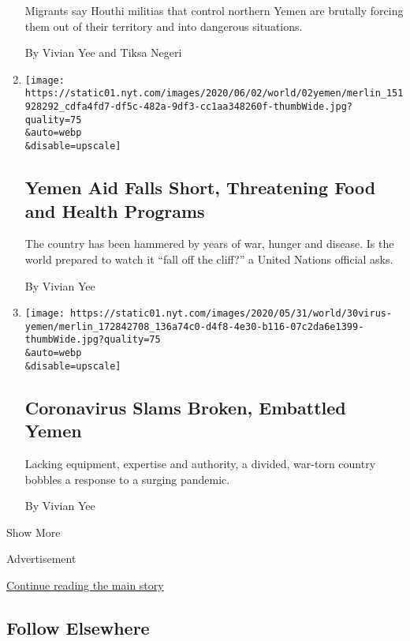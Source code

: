 \begin{enumerate}
  Migrants say Houthi militias that control northern Yemen are brutally
  forcing them out of their territory and into dangerous situations.

  By Vivian Yee and Tiksa Negeri
\item
  \href{/2020/06/02/world/middleeast/yemen-saudi-united-nations-aid.html}{}

  \texttt{[image: https://static01.nyt.com/images/2020/06/02/world/02yemen/merlin\_151928292\_cdfa4fd7-df5c-482a-9df3-cc1aa348260f-thumbWide.jpg?quality=75\\\&auto=webp\\\&disable=upscale]}

  \hypertarget{yemen-aid-falls-short-threatening-food-and-health-programs}{%
  \subsection{Yemen Aid Falls Short, Threatening Food and Health
  Programs}\label{yemen-aid-falls-short-threatening-food-and-health-programs}}

  The country has been hammered by years of war, hunger and disease. Is
  the world prepared to watch it ``fall off the cliff?'' a United
  Nations official asks.

  By Vivian Yee
\item
  \href{/2020/05/30/world/middleeast/virus-yemen.html}{}

  \texttt{[image: https://static01.nyt.com/images/2020/05/31/world/30virus-yemen/merlin\_172842708\_136a74c0-d4f8-4e30-b116-07c2da6e1399-thumbWide.jpg?quality=75\\\&auto=webp\\\&disable=upscale]}

  \hypertarget{coronavirus-slams-broken-embattled-yemen}{%
  \subsection{Coronavirus Slams Broken, Embattled
  Yemen}\label{coronavirus-slams-broken-embattled-yemen}}

  Lacking equipment, expertise and authority, a divided, war-torn
  country bobbles a response to a surging pandemic.

  By Vivian Yee
\end{enumerate}

Show More

Advertisement

\protect\hyperlink{after-mid2}{Continue reading the main story}

\hypertarget{follow-elsewhere}{%
\subsection{Follow Elsewhere}\label{follow-elsewhere}}

